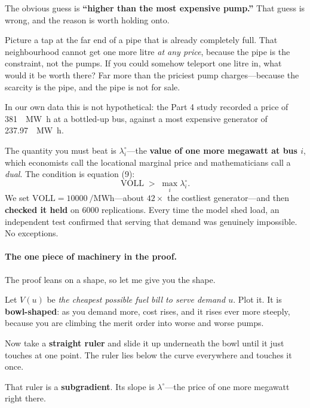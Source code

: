 \documentclass[11pt,a4paper]{article}
\newcommand{\VOLL}{\mathrm{VOLL}}
\begin{document}
\begin{anchor}
The obvious guess is \textbf{``higher than the most expensive pump.''} That
guess is wrong, and the reason is worth holding onto.

Picture a tap at the far end of a pipe that is already completely full. That
neighbourhood cannot get one more litre \emph{at any price}, because the pipe
is the constraint, not the pumps. If you could somehow teleport one litre in,
what would it be worth there? Far more than the priciest pump charges---because
the scarcity is the pipe, and the pipe is not for sale.

In our own data this is not hypothetical: the Part 4 study recorded a price of
\SI{381}{\per\mega\watt\hour} at a bottled-up bus, against a most expensive
generator of \SI{237.97}{\per\mega\watt\hour}.
\end{anchor}

\begin{build}
The quantity you must beat is $\lambda^\circ_i$---the \textbf{value of one more
megawatt at bus $i$}, which economists call the locational marginal price and
mathematicians call a \emph{dual}. The condition is equation (9):
\[
\VOLL \;>\; \max_i \lambda^\circ_i .
\]
We set $\VOLL = \SI{10000}{\per\mega\watt\hour}$---about $42\times$ the
costliest generator---and then \textbf{checked it held} on \num{6000}
replications. Every time the model shed load, an independent test confirmed
that serving that demand was genuinely impossible. No exceptions.
\end{build}

\paragraph{The one piece of machinery in the proof.}
The proof leans on a shape, so let me give you the shape.

\begin{anchor}
Let $V(u)$ be \emph{the cheapest possible fuel bill to serve demand $u$}. Plot
it. It is \textbf{bowl-shaped}: as you demand more, cost rises, and it rises
ever more steeply, because you are climbing the merit order into worse and
worse pumps.

Now take a \textbf{straight ruler} and slide it up underneath the bowl until it
just touches at one point. The ruler lies below the curve everywhere and
touches it once.

That ruler is a \textbf{subgradient}. Its slope is $\lambda^\circ$---the price
of one more megawatt right there.
\end{anchor}
\end{document}
